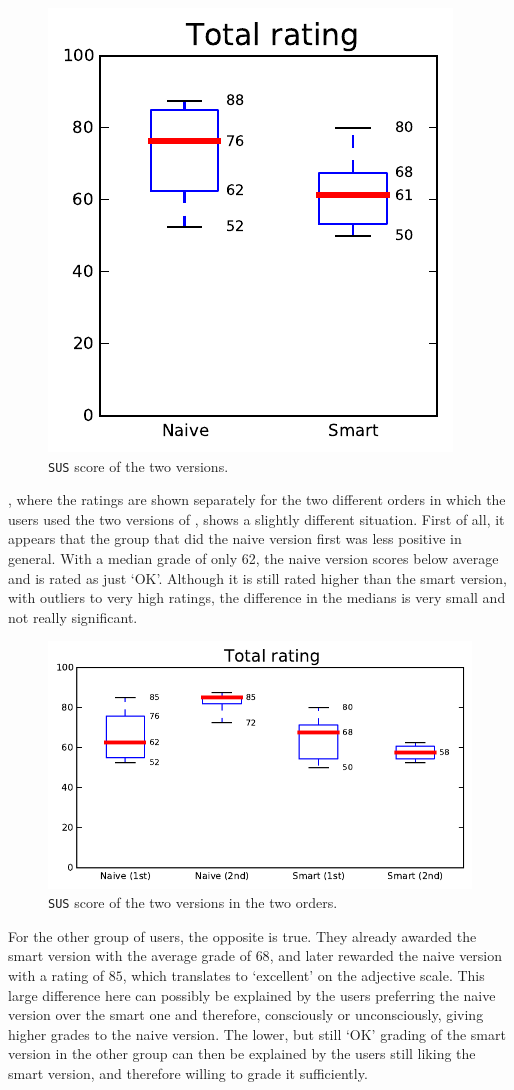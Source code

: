 \begin{figure}[h!]
\center
\includegraphics[width=.32\textwidth]{img/graphs/4a_10.pdf}
\caption{\texttt{SUS} score of the two versions.}
\end{figure}

, where the ratings are shown separately for the two different orders in which the users used the two versions of \oframp, shows a slightly different situation. First of all, it appears that the group that did the naive version first was less positive in general. With a median grade of only 62, the naive version scores below average and is rated as just `OK'. Although it is still rated higher than the smart version, with outliers to very high ratings, the difference in the medians is very small and not really significant.

\begin{figure}[h!]
\center
\includegraphics[width=.6\textwidth]{img/graphs/4b_10.pdf}
\caption{\texttt{SUS} score of the two versions in the two orders.}
\end{figure}

For the other group of users, the opposite is true. They already awarded the smart version with the average grade of $68$, and later rewarded the naive version with a rating of $85$, which translates to `excellent' on the adjective scale. This large difference here can possibly be explained by the users preferring the naive version over the smart one and therefore, consciously or unconsciously, giving higher grades to the naive version. The lower, but still `OK' grading of the smart version in the other group can then be explained by the users still liking the smart version, and therefore willing to grade it sufficiently.


